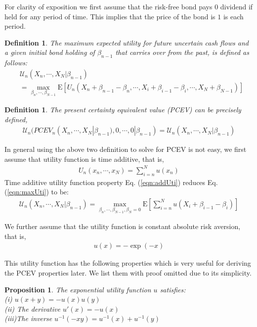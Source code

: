 \documentclass{article}[12pt letter]
\newtheorem{definition}[theorem]{Definition}
\newtheorem{proposition}[theorem]{Proposition}
\newcommand{\E}{\mathrm{E}}
\begin{document}
For clarity of exposition we first assume that the risk-free bond pays $0$ dividend if held for any period of time. This implies that the price of the bond is $1$ is each period.

\begin{definition} The maximum expected utility for future uncertain cash flows and a given initial bond holding of $\beta_{n-1}$ that carries over from the past, is defined as follows:
\begin{align} \label{eqn:maxUti}
    &\mathcal{U}_n(X_n,\cdots, X_{N}|\beta_{n-1}) \nonumber \\
    & = \max_{\beta_n, \cdots, \beta_{N-1}} \E [U_n(X_n+\beta_{n-1}-\beta_n, \cdots, X_i + \beta_{i-1}-\beta_i, \cdots, X_N + \beta_{N-1}) ]
\end{align}
\end{definition}

\begin{definition} The present certainty equivalent value (PCEV) can be precisely defined,
\begin{align} \label{eqn:PCEV}
    \mathcal{U}_n(PCEV_n(X_n, \cdots, X_N|\beta_{n-1}), 0,\cdots,0|\beta_{n-1})=\mathcal{U}_n(X_n,\cdots, X_{N}|\beta_{n-1})
\end{align}
\end{definition}
In general using the above two definition to solve for PCEV is not easy, we first assume that  utility function is time additive, that is,
\begin{align}\label{eqn:addUti}
 U_n(x_n, \cdots, x_{N}) = \sum_{i = n}^Nu(x_n)
\end{align}
Time additive utility function property Eq. (\ref{eqn:addUti}) reduces Eq. (\ref{eqn:maxUti}) to be:
\begin{align} \label{eqn:maxAddUti}
    \mathcal{U}_n(X_n,\cdots, X_{N}|\beta_{n-1}) = \max_{\beta_n, \cdots, \beta_{N-1},\beta_N = 0} \E [\sum_{i=n}^N u( X_i + \beta_{i-1}-\beta_i)]
\end{align}


We further assume that the utility function is constant absolute risk aversion, that is,
\begin{align}\label{eqn:expUti}
u(x) = -\exp(-x)\end{align}

This utility function has the following properties which is very useful for deriving the PCEV properties later. We list them with proof omitted due to its simplicity.
\begin{proposition} The exponential utility function $u$ satisfies: \\
(i) $u(x+y) = -u(x)u(y)$ \\
(ii) The derivative $u' (x) = -u(x)$ \\
(iii)The inverse $u^{-1}(-xy) = u^{-1} (x) + u^{-1} (y)$
\end{proposition}
\end{document}
